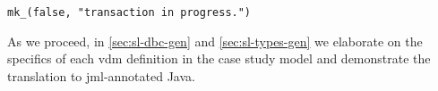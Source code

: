 \begin{lstlisting}[style=racOutput,caption={System output after fixing
the problem in
\autoref{lst:jmlScenario}.},label={lst:racOutputSuccess}]
mk_(false, "transaction in progress.")
\end{lstlisting}

As we proceed, in \autoref{sec:sl-dbc-gen} and
\autoref{sec:sl-types-gen} we elaborate on the specifics of each
\ac{vdm} definition in the case study model and demonstrate the
translation to \ac{jml}-annotated Java.


